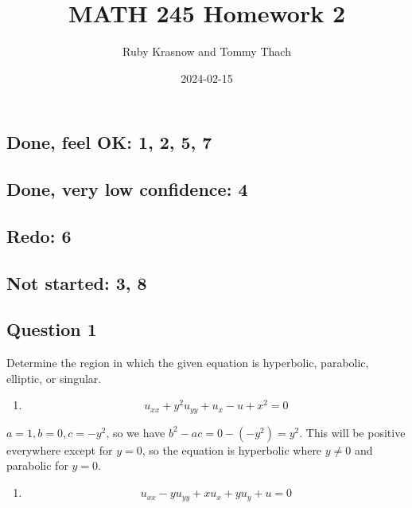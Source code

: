 \documentclass[
]{article}
\title{MATH 245 Homework 2}
\author{Ruby Krasnow and Tommy Thach}
\date{2024-02-15}
\providecommand{\tightlist}{%
  \setlength{\itemsep}{0pt}\setlength{\parskip}{0pt}}
\begin{document}
\maketitle

\hypertarget{done-feel-ok-1-2-5-7}{%
\subsection{Done, feel OK: 1, 2, 5, 7}\label{done-feel-ok-1-2-5-7}}

\hypertarget{done-very-low-confidence-4}{%
\subsection{Done, very low confidence:
4}\label{done-very-low-confidence-4}}

\hypertarget{redo-6}{%
\subsection{Redo: 6}\label{redo-6}}

\hypertarget{not-started-3-8}{%
\subsection{Not started: 3, 8}\label{not-started-3-8}}

\hypertarget{question-1}{%
\subsection{Question 1}\label{question-1}}

Determine the region in which the given equation is hyperbolic,
parabolic, elliptic, or singular.

\begin{enumerate}
\def\labelenumi{\alph{enumi})}
\tightlist
\item
  \[u_{xx}+y^2u_{yy}+u_x-u+x^2=0 \]
\end{enumerate}

\(a=1, b=0, c=-y^2\), so we have \(b^2-ac=0-(-y^2)=y^2\). This will be
positive everywhere except for \(y=0\), so the equation is hyperbolic
where \(y \neq 0\) and parabolic for \(y=0\).

\begin{enumerate}
\def\labelenumi{\alph{enumi})}
\setcounter{enumi}{1}
\tightlist
\item
  \[u_{xx}-yu_{yy}+xu_x+yu_y+u=0 \]
\end{enumerate}
\end{document}
